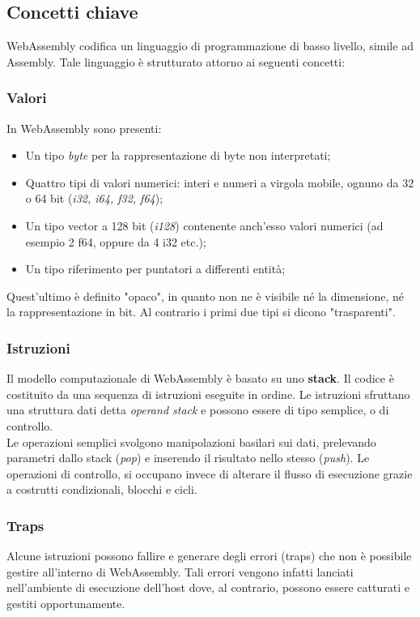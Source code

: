 \subsection{Concetti chiave}
WebAssembly codifica un linguaggio di programmazione di basso livello, simile ad Assembly. Tale linguaggio è strutturato attorno ai seguenti concetti:\cite*{wasmSpec}

\subsubsection{Valori}
\label{subsub:Valori}
In WebAssembly sono presenti:
\begin{itemize}
        \item Un tipo \emph{byte} per la rappresentazione di byte non interpretati;
        \item Quattro tipi di valori numerici: interi e numeri a virgola mobile, ognuno da 32 o 64 bit (\emph{i32, i64, f32, f64});
        \item Un tipo vector a 128 bit (\emph{i128}) contenente anch'esso valori numerici (ad esempio 2 f64, oppure da 4 i32 etc.);
        \item Un tipo riferimento per puntatori a differenti entità;
\end{itemize}
Quest'ultimo è definito "opaco", in quanto non ne è visibile né la dimensione, né la rappresentazione in bit. Al contrario i primi due tipi si dicono "trasparenti".
\newpage
\subsubsection{Istruzioni}
Il modello computazionale di WebAssembly è basato su uno \textbf{stack}. Il codice è costituito da una sequenza di istruzioni eseguite in ordine. Le istruzioni sfruttano una struttura dati detta \emph{operand stack} e possono essere di tipo semplice, o di controllo.
\\Le operazioni semplici svolgono manipolazioni basilari sui dati, prelevando parametri dallo stack (\emph{pop}) e inserendo il risultato nello stesso (\emph{push}). Le operazioni di controllo, si occupano invece di alterare il flusso di esecuzione grazie a costrutti condizionali, blocchi e cicli.
\subsubsection{Traps} 
Alcune istruzioni possono fallire e generare degli errori (traps) che non è possibile gestire all'interno di WebAssembly. Tali errori vengono infatti lanciati nell'ambiente di esecuzione dell'host dove, al contrario, possono essere catturati e gestiti opportunamente.
